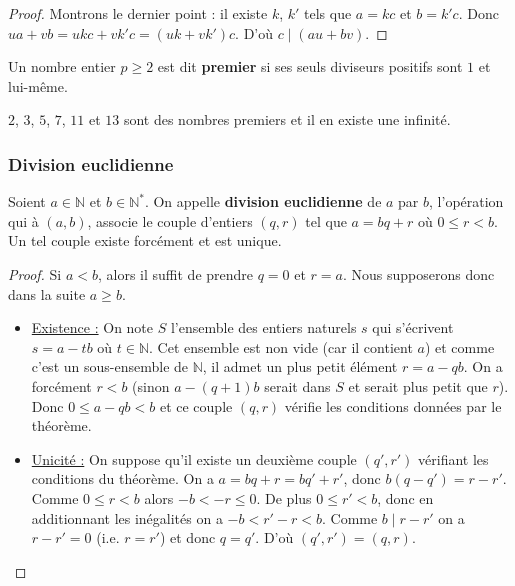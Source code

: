   \begin{proof}
    Montrons le dernier point : il existe $k$, $k'$ tels que $a = kc$ et $b = k'c$. Donc $ua + vb = ukc + vk'c = (uk + vk')c$. D'où $c \mid (au + bv)$.
  \end{proof}

  \begin{definition}
    Un nombre entier $p \geq 2$ est dit \textbf{premier} si ses seuls diviseurs positifs sont $1$ et lui-même.
  \end{definition}

  \begin{example}
    $2$, $3$, $5$, $7$, $11$ et $13$ sont des nombres premiers et il en existe une infinité.
  \end{example}

  \subsubsection{Division euclidienne}

  \begin{theorem}
    Soient $a \in \mathbb{N}$ et $b \in \mathbb{N}^*$. On appelle \textbf{division euclidienne} de $a$ par $b$, l'opération qui à $(a, b)$, associe le couple d'entiers $(q, r)$ tel que $a = bq + r$ où $0 \leq r < b$. Un tel couple existe forcément et est unique.
  \end{theorem}

  \begin{proof}
    Si $a < b$, alors il suffit de prendre $q = 0$ et $r = a$. Nous supposerons donc dans la suite $a \geq b$.
    \begin{itemize}
      \item \uline{Existence :} On note $S$ l'ensemble des entiers naturels $s$ qui s'écrivent $s = a - tb$ où $t \in \mathbb{N}$. Cet ensemble est non vide (car il contient $a$) et comme c'est un sous-ensemble de $\mathbb{N}$, il admet un plus petit élément $r = a - qb$. On a forcément $r < b$ (sinon $a-(q+1)b$ serait dans $S$ et serait plus petit que $r$). Donc $0 \leq a - qb < b$ et ce couple $(q, r)$ vérifie les conditions données par le théorème.
      \item \uline{Unicité :} On suppose qu'il existe un deuxième couple $(q', r')$ vérifiant les conditions du théorème. On a $a = bq + r = bq' + r'$, donc $b(q-q') = r-r'$. Comme $0 \leq r < b$ alors $-b < -r \leq 0$. De plus $0 \leq r' < b$, donc en additionnant les inégalités on a $-b < r' - r < b$. Comme $b \mid r - r'$ on a $r - r' = 0$ (i.e. $r = r'$) et donc $q = q'$. D'où $(q', r') = (q, r)$.
    \end{itemize}
  \end{proof}

